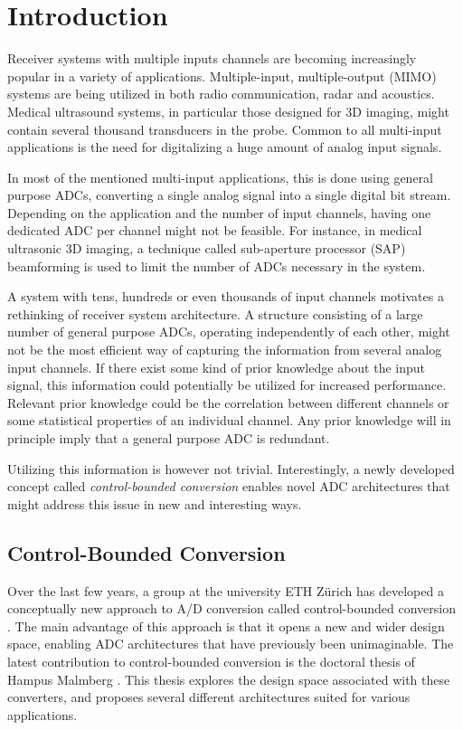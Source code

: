 \chapter{Introduction}
Receiver systems with multiple inputs channels are becoming increasingly popular in a variety of applications. Multiple-input, multiple-output (MIMO) systems are being utilized in both radio communication, radar and acoustics. Medical ultrasound systems, in particular those designed for 3D imaging, might contain several thousand transducers in the probe. Common to all multi-input applications is the need for digitalizing a huge amount of analog input signals.

In most of the mentioned multi-input applications, this is done using general purpose ADCs, converting a single analog signal into a single digital bit stream. Depending on the application and the number of input channels, having one dedicated ADC per channel might not be feasible. For instance, in medical ultrasonic 3D imaging, a technique called sub-aperture processor (SAP) beamforming is used to limit the number of ADCs necessary in the system.

A system with tens, hundreds or even thousands of input channels motivates a rethinking of receiver system architecture. A structure consisting of a large number of general purpose ADCs, operating independently of each other, might not be the most efficient way of capturing the information from several analog input channels. If there exist some kind of prior knowledge about the input signal, this information could potentially be utilized for increased performance. Relevant prior knowledge could be the correlation between different channels or some statistical properties of an individual channel. Any prior knowledge will in principle imply that a general purpose ADC is redundant.

Utilizing this information is however not trivial. Interestingly, a newly developed concept called \textit{control-bounded conversion} enables novel ADC architectures that might address this issue in new and interesting ways.

\section{Control-Bounded Conversion}
Over the last few years, a group at the university ETH Zürich has developed a conceptually new approach to A/D conversion called control-bounded conversion \cite{cbc_2020_loeliger}. The main advantage of this approach is that it opens a new and wider design space, enabling ADC architectures that have previously been unimaginable. The latest contribution to control-bounded conversion is the doctoral thesis of Hampus Malmberg \cite{malmberg_thesis}. This thesis explores the design space associated with these converters, and proposes several different architectures suited for various applications.

